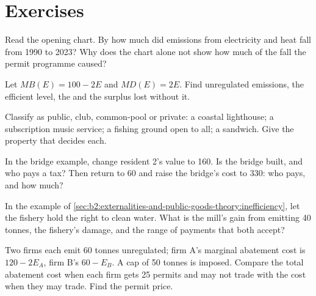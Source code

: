 \section{Exercises}\label{sec:b2:externalities-and-public-goods-theory:exercises}

\begin{exercise}[$\star$]\label{exo:b2:externalities-and-public-goods-theory:1}
Read the opening chart. By how much did emissions from electricity and heat fall from 1990 to 2023? Why does the chart alone
not show how much of the fall the permit programme caused?
\end{exercise}

\begin{exercise}[$\star$]\label{exo:b2:externalities-and-public-goods-theory:2}
Let $\mathit{MB}(E) = 100 - 2E$ and $\mathit{MD}(E) = 2E$. Find unregulated emissions, the efficient level, the  and the surplus lost
without it.
\end{exercise}

\begin{exercise}[$\star$]\label{exo:b2:externalities-and-public-goods-theory:3}
Classify as public, club, common-pool or private: a coastal lighthouse; a subscription music service; a fishing ground open
to all; a sandwich. Give the property that decides each.
\end{exercise}

\begin{exercise}[$\star$]\label{exo:b2:externalities-and-public-goods-theory:4}
In the bridge example, change resident 2's value to 160. Is the bridge built, and who pays a tax? Then return to 60 and
raise the bridge's cost to 330: who pays, and how much?
\end{exercise}

\begin{exercise}[$\star\star$]\label{exo:b2:externalities-and-public-goods-theory:5}
In the example of \cref{sec:b2:externalities-and-public-goods-theory:inefficiency}, let the fishery hold the right to clean
water. What is the mill's gain from emitting 40 tonnes, the fishery's damage, and the range of payments that both accept?
\end{exercise}

\begin{exercise}[$\star\star$]\label{exo:b2:externalities-and-public-goods-theory:6}
Two firms each emit 60 tonnes unregulated; firm A's marginal abatement cost is $120 - 2E_A$, firm B's $60 - E_B$. A cap of 50 tonnes is
imposed. Compare the total abatement cost when each firm gets 25 permits and may not trade with the cost when they may
trade. Find the permit price.
\end{exercise}

